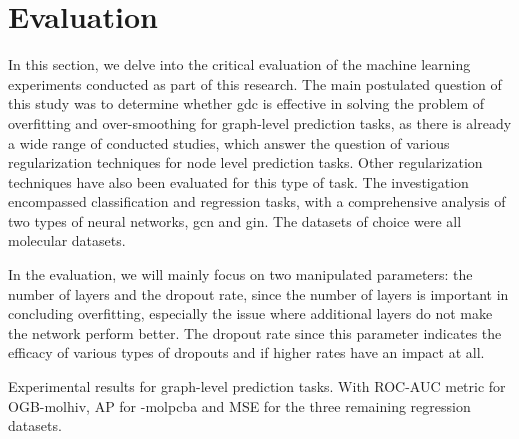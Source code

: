 %
\chapter{Evaluation}
\label{sec:eval}

In this section, we delve into the critical evaluation of the machine learning experiments conducted as part of this research.
The main postulated question of this study was to determine whether \ac{gdc} is effective in solving the problem of overfitting and over-smoothing for graph-level prediction tasks, as there is already a wide range of conducted studies, which answer the question of various regularization techniques for node level prediction tasks. Other regularization techniques have also been evaluated for this type of task.
The investigation encompassed classification and regression tasks, with a comprehensive analysis of two types of neural networks, \ac{gcn} and \ac{gin}.
The datasets of choice were all molecular datasets.

In the evaluation, we will mainly focus on two manipulated parameters: the number of layers and the dropout rate, since the number of layers is important in concluding overfitting, especially the issue where additional layers do not make the network perform better. The dropout rate since this parameter indicates the efficacy of various types of dropouts and if higher rates have an impact at all.

\begin{table*}[t]
    \caption{
        Experimental results for graph-level prediction tasks. With ROC-AUC metric for OGB-molhiv, AP for -molpcba and MSE for the three remaining regression datasets.
    }\label{tbl:eval:results}
    \centering
    {\small%
        }
\end{table*}

